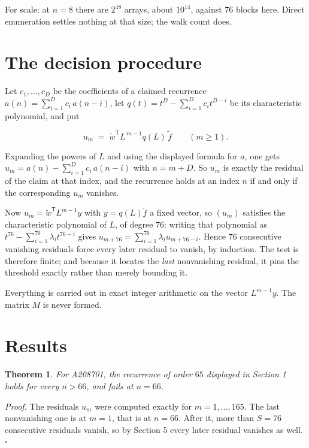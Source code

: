 \documentclass[11pt]{article}
\newtheorem{theorem}{Theorem}
\theoremstyle{definition}
\begin{document}
For scale: at $n = 8$ there are $2^{48}$ arrays, about $10^{14}$, against $76$ blocks here. Direct enumeration settles nothing at that size; the walk count does.

\section{The decision procedure}

Let $c_1,\dots,c_D$ be the coefficients of a claimed recurrence $a(n) = \sum_{i=1}^{D} c_i\,a(n-i)$, let $q(t) = t^{D} - \sum_{i=1}^{D} c_i t^{D-i}$ be its characteristic polynomial, and put

\[u_m \;=\; \tilde w^{\mathsf T} L^{\,m-1} q(L)\,\tilde f \qquad (m \ge 1).\]

Expanding the powers of $L$ and using the displayed formula for $a$, one gets $u_m = a(n) - \sum_{i=1}^{D} c_i\,a(n-i)$ with $n = m + D$. So $u_m$ is exactly the residual of the claim at that index, and the recurrence holds at an index $n$ if and only if the corresponding $u_m$ vanishes.

Now $u_m = \tilde w^{\mathsf T} L^{m-1} y$ with $y = q(L)\tilde f$ a fixed vector, so $(u_m)$ satisfies the characteristic polynomial of $L$, of degree $76$: writing that polynomial as $t^{76} - \sum_{i=1}^{76} \lambda_i t^{76-i}$ gives $u_{m+76} = \sum_{i=1}^{76} \lambda_i u_{m+76-i}$. Hence $76$ consecutive vanishing residuals force every later residual to vanish, by induction. The test is therefore finite; and because it locates the {\itshape last} nonvanishing residual, it pins the threshold exactly rather than merely bounding it.

Everything is carried out in exact integer arithmetic on the vector $L^{m-1}y$. The matrix $M$ is never formed.

\section{Results}

\begin{theorem} For A208701, the recurrence of order $65$ displayed in Section 1 holds for every $n > 66$, and fails at $n = 66$.\end{theorem}

{\itshape Proof.} The residuals $u_m$ were computed exactly for $m = 1,\dots,165$. The last nonvanishing one is at $m = 1$, that is at $n = 66$. After it, more than $S = 76$ consecutive residuals vanish, so by Section 5 every later residual vanishes as well. $\square$
\end{document}
